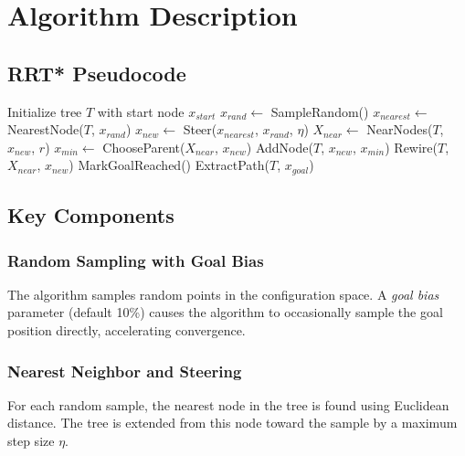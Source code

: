 \documentclass[12pt,a4paper]{scrartcl}
\begin{document}
	\section{Algorithm Description}
	
	\subsection{RRT* Pseudocode}
	
	\begin{algorithm}[H]
		\caption{RRT* Algorithm}
		\begin{algorithmic}[1]
			\State Initialize tree $T$ with start node $x_{start}$
				\State $x_{rand} \gets$ SampleRandom() 
				\State $x_{nearest} \gets$ NearestNode($T$, $x_{rand}$)
				\State $x_{new} \gets$ Steer($x_{nearest}$, $x_{rand}$, $\eta$)
					\State $X_{near} \gets$ NearNodes($T$, $x_{new}$, $r$)
					\State $x_{min} \gets$ ChooseParent($X_{near}$, $x_{new}$) 
					\State AddNode($T$, $x_{new}$, $x_{min}$)
					\State Rewire($T$, $X_{near}$, $x_{new}$) 
						\State MarkGoalReached()
					\EndIf
				\EndIf
			\EndFor
			\State \Return ExtractPath($T$, $x_{goal}$)
		\end{algorithmic}
	\end{algorithm}
	
	\subsection{Key Components}
	
	\subsubsection{Random Sampling with Goal Bias}
	The algorithm samples random points in the configuration space. A \textit{goal bias} parameter (default 10\%) causes the algorithm to occasionally sample the goal position directly, accelerating convergence.
	
	\subsubsection{Nearest Neighbor and Steering}
	For each random sample, the nearest node in the tree is found using Euclidean distance. The tree is extended from this node toward the sample by a maximum step size $\eta$.
	
\end{document}
